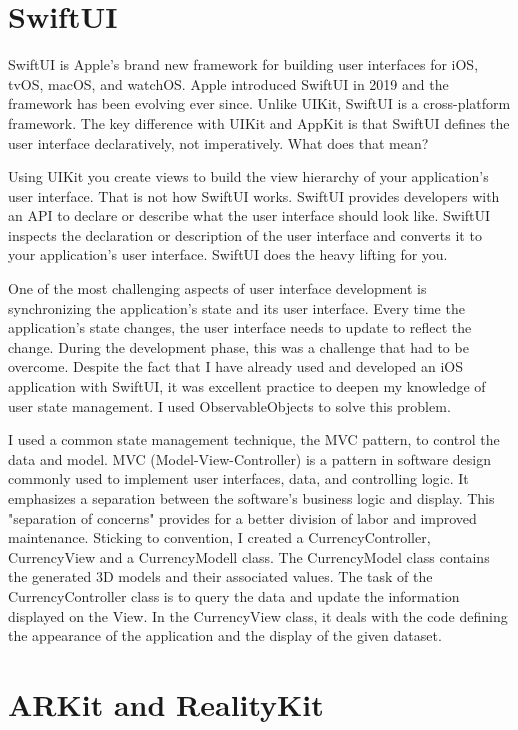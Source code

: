 \documentclass[11pt,a4paper,oneside]{report}
\begin{document}
\section{SwiftUI}

SwiftUI is Apple's brand new framework for building user interfaces for iOS, tvOS, macOS, and watchOS. Apple introduced SwiftUI in 2019 and the framework has been evolving ever since. Unlike UIKit, SwiftUI is a cross-platform framework. The key difference with UIKit and AppKit is that SwiftUI defines the user interface declaratively, not imperatively. What does that mean?

Using UIKit you create views to build the view hierarchy of your application's user interface. That is not how SwiftUI works. SwiftUI provides developers with an API to declare or describe what the user interface should look like. SwiftUI inspects the declaration or description of the user interface and converts it to your application's user interface. SwiftUI does the heavy lifting for you.

One of the most challenging aspects of user interface development is synchronizing the application's state and its user interface. Every time the application's state changes, the user interface needs to update to reflect the change. During the development phase, this was a challenge that had to be overcome. Despite the fact that I have already used and developed an iOS application with SwiftUI, it was excellent practice to deepen my knowledge of user state management. I used ObservableObjects to solve this problem.

I used a common state management technique, the MVC pattern, to control the data and model. MVC (Model-View-Controller) is a pattern in software design commonly used to implement user interfaces, data, and controlling logic. It emphasizes a separation between the software's business logic and display. This "separation of concerns" provides for a better division of labor and improved maintenance. Sticking to convention, I created a CurrencyController, CurrencyView and a CurrencyModell class. The CurrencyModel class contains the generated 3D models and their associated values. The task of the CurrencyController class is to query the data and update the information displayed on the View. In the CurrencyView class, it deals with the code defining the appearance of the application and the display of the given dataset.


\section{ARKit and RealityKit}
\end{document}
